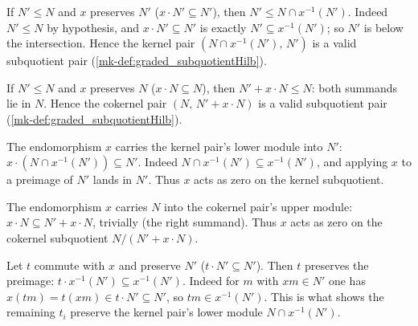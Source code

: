 \begin{lemma}\label{mk-lem:graded_ker_le}
  \leanok

  If \(N' \le N\) and \(x\) preserves \(N'\) (\(x \cdot N' \subseteq N'\)), then
  \(N' \le N \cap x^{-1}(N')\). Indeed \(N' \le N\) by hypothesis, and \(x \cdot N'
  \subseteq N'\) is exactly \(N' \subseteq x^{-1}(N')\); so \(N'\) is below the
  intersection. Hence the kernel pair \((N \cap x^{-1}(N'),\, N')\) is a valid
  subquotient pair (\ref{mk-def:graded_subquotientHilb}).
\end{lemma}

\begin{lemma}\label{mk-lem:graded_coker_le}
  \leanok

  If \(N' \le N\) and \(x\) preserves \(N\) (\(x \cdot N \subseteq N\)), then
  \(N' + x \cdot N \le N\): both summands lie in \(N\). Hence the cokernel pair
  \((N,\, N' + x \cdot N)\) is a valid subquotient pair
  (\ref{mk-def:graded_subquotientHilb}).
\end{lemma}

\begin{lemma}\label{mk-lem:graded_ker_annihilate}
  \leanok

  The endomorphism \(x\) carries the kernel pair's lower module into \(N'\):
  \(x \cdot (N \cap x^{-1}(N')) \subseteq N'\). Indeed \(N \cap x^{-1}(N') \subseteq
  x^{-1}(N')\), and applying \(x\) to a preimage of \(N'\) lands in \(N'\). Thus \(x\)
  acts as zero on the kernel subquotient.
\end{lemma}

\begin{lemma}\label{mk-lem:graded_coker_annihilate}
  \leanok

  The endomorphism \(x\) carries \(N\) into the cokernel pair's upper module:
  \(x \cdot N \subseteq N' + x \cdot N\), trivially (the right summand). Thus \(x\)
  acts as zero on the cokernel subquotient \(N/(N' + x \cdot N)\).
\end{lemma}

\begin{lemma}\label{mk-lem:graded_comap_map_le_of_commute}
  \leanok

  Let \(t\) commute with \(x\) and preserve \(N'\) (\(t \cdot N' \subseteq N'\)). Then
  \(t\) preserves the preimage: \(t \cdot x^{-1}(N') \subseteq x^{-1}(N')\). Indeed for
  \(m\) with \(x m \in N'\) one has \(x(t m) = t(x m) \in t \cdot N' \subseteq N'\), so
  \(t m \in x^{-1}(N')\). This is what shows the remaining \(t_i\) preserve the kernel
  pair's lower module \(N \cap x^{-1}(N')\).
\end{lemma}

